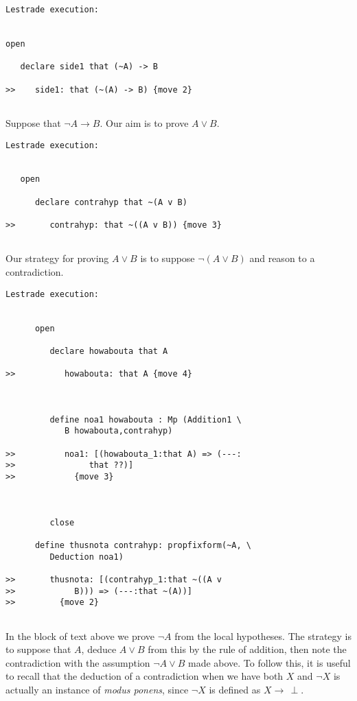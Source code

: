 \documentclass[12pt]{article}
\begin{document}
\begin{verbatim}Lestrade execution:


open

   declare side1 that (~A) -> B

>>    side1: that (~(A) -> B) {move 2}


\end{verbatim}

Suppose that $\neg A \rightarrow B$.  Our aim is to prove $A \vee B$.

\begin{verbatim}Lestrade execution:


   open

      declare contrahyp that ~(A v B)

>>       contrahyp: that ~((A v B)) {move 3}


\end{verbatim}

Our strategy for proving $A \vee B$ is to suppose $\neg(A \vee B)$ and reason to a contradiction.

\begin{verbatim}Lestrade execution:


      open

         declare howabouta that A

>>          howabouta: that A {move 4}



         define noa1 howabouta : Mp (Addition1 \
            B howabouta,contrahyp)

>>          noa1: [(howabouta_1:that A) => (---:
>>               that ??)]
>>            {move 3}



         close

      define thusnota contrahyp: propfixform(~A, \
         Deduction noa1)

>>       thusnota: [(contrahyp_1:that ~((A v
>>            B))) => (---:that ~(A))]
>>         {move 2}


\end{verbatim}

In the block of text above we prove $\neg A$ from the local hypotheses.  The strategy is to suppose that $A$, deduce $A \vee B$ from this by 
the rule of addition, then note the contradiction with the assumption $\neg A \vee B$ made above.  To follow this, it is useful to recall that the 
deduction of a contradiction when we have both $X$ and $\neg X$ is actually an instance of {\em modus ponens\/}, since $\neg X$ is defined
as $X \rightarrow \,\perp$.
\end{document}
